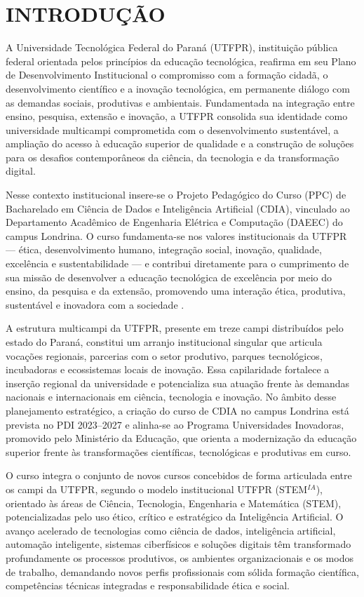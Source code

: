 \chapter{INTRODUÇÃO}

A Universidade Tecnológica Federal do Paraná (UTFPR), instituição pública federal orientada pelos princípios da educação tecnológica, reafirma em seu Plano de Desenvolvimento Institucional \cite{UTFPR_PDI_2023} o compromisso com a formação cidadã, o desenvolvimento científico e a inovação tecnológica, em permanente diálogo com as demandas sociais, produtivas e ambientais. Fundamentada na integração entre ensino, pesquisa, extensão e inovação, a UTFPR consolida sua identidade como universidade multicampi comprometida com o desenvolvimento sustentável, a ampliação do acesso à educação superior de qualidade e a construção de soluções para os desafios contemporâneos da ciência, da tecnologia e da transformação digital.

Nesse contexto institucional insere-se o Projeto Pedagógico do Curso (PPC) de Bacharelado em Ciência de Dados e Inteligência Artificial (CDIA), vinculado ao Departamento Acadêmico de Engenharia Elétrica e Computação (DAEEC) do campus Londrina. O curso fundamenta-se nos valores institucionais da UTFPR — ética, desenvolvimento humano, integração social, inovação, qualidade, excelência e sustentabilidade — e contribui diretamente para o cumprimento de sua missão de desenvolver a educação tecnológica de excelência por meio do ensino, da pesquisa e da extensão, promovendo uma interação ética, produtiva, sustentável e inovadora com a sociedade \cite{UTFPR_PDI_2023}.

A estrutura multicampi da UTFPR, presente em treze campi distribuídos pelo estado do Paraná, constitui um arranjo institucional singular que articula vocações regionais, parcerias com o setor produtivo, parques tecnológicos, incubadoras e ecossistemas locais de inovação. Essa capilaridade fortalece a inserção regional da universidade e potencializa sua atuação frente às demandas nacionais e internacionais em ciência, tecnologia e inovação. No âmbito desse planejamento estratégico, a criação do curso de CDIA no campus Londrina está prevista no PDI 2023–2027 \cite{UTFPR_PDI_2023} e alinha-se ao Programa Universidades Inovadoras, promovido pelo Ministério da Educação, que orienta a modernização da educação superior frente às transformações científicas, tecnológicas e produtivas em curso.

O curso integra o conjunto de novos cursos concebidos de forma articulada entre os campi da UTFPR, segundo o modelo institucional UTFPR (STEM$^{IA}$), orientado às áreas de Ciência, Tecnologia, Engenharia e Matemática (STEM), potencializadas pelo uso ético, crítico e estratégico da Inteligência Artificial. O avanço acelerado de tecnologias como ciência de dados, inteligência artificial, automação inteligente, sistemas ciberfísicos e soluções digitais têm transformado profundamente os processos produtivos, os ambientes organizacionais e os modos de trabalho, demandando novos perfis profissionais com sólida formação científica, competências técnicas integradas e responsabilidade ética e social.

